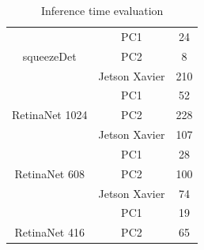 \documentclass[twoside]{ctuthesis}
\theoremstyle{plain}
\theoremstyle{definition}
\theoremstyle{note}
\begin{document}
\begin{table}[hbt]
\begin{tabular}{|c|c|c|}
                                                         & PC1                                                        & 24                                                                         \\ \cline{2-3} 
\multirow{-3}{*}{squeezeDet}                             & PC2                                                        & 8                                                                          \\ \hline
                                                         & Jetson Xavier                                              & 210                                                                        \\ \cline{2-3} 
                                                         & PC1                                                        & 52                                                                         \\ \cline{2-3} 
\multirow{-3}{*}{RetinaNet 1024}                      & PC2                                                        & 228                                                                        \\ \hline
                                                         & Jetson Xavier                                              & 107                                                                        \\ \cline{2-3} 
                                                         & PC1                                                        & 28                                                                         \\ \cline{2-3} 
\multirow{-3}{*}{RetinaNet 608}                       & PC2                                                        & 100                                                                        \\ \hline
                                                         & Jetson Xavier                                              & 74                                                                         \\ \cline{2-3} 
                                                         & PC1                                                        & 19                                                                         \\ \cline{2-3} 
\multirow{-3}{*}{RetinaNet 416}                       & PC2                                                        & 65                                                                         \\ \hline
\end{tabular}
\caption{Inference time evaluation}
\label{inference_time}
\end{table}
\end{document}

